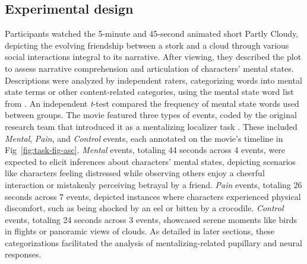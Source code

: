 \subsection{Experimental design }
Participants watched the 5-minute and 45-second animated short Partly Cloudy, depicting the evolving friendship between a stork and a cloud through various social interactions integral to its narrative. After viewing, they described the plot to assess narrative comprehension and articulation of characters' mental states. Descriptions were analyzed by independent raters, categorizing words into mental state terms or other content-related categories, using the mental state word list from \cite{bang2013}. An independent \textit{t}-test compared the frequency of mental state words used between groups. The movie featured three types of events, coded by the original research team that introduced it as a mentalizing localizer task \citep{jacoby2016}. These included \textit{Mental}, \textit{Pain}, and \textit{Control} events, each annotated on the movie's timeline in Fig~\ref{fig:task-fig-asc}. \textit{Mental} events, totaling 44 seconds across 4 events, were expected to elicit inferences about characters' mental states, depicting scenarios like characters feeling distressed while observing others enjoy a cheerful interaction or mistakenly perceiving betrayal by a friend. \textit{Pain} events, totaling 26 seconds across 7 events, depicted instances where characters experienced physical discomfort, such as being shocked by an eel or bitten by a crocodile. \textit{Control} events, totaling 24 seconds across 3 events, showcased serene moments like birds in flights or panoramic views of clouds. As detailed in later sections, these categorizations facilitated the analysis of mentalizing-related pupillary and neural responses.



